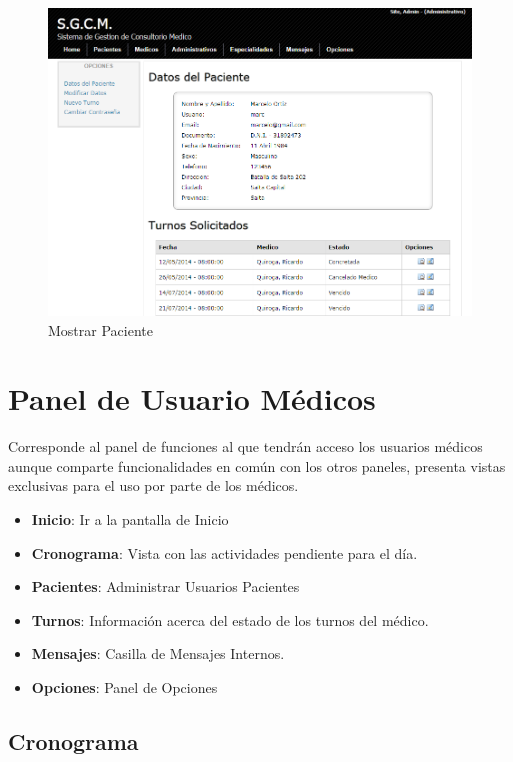 \begin{figure}[H]
    \centering
    \includegraphics[scale=0.5]{resourse/datos-paciente-a.png}
    \caption{Mostrar Paciente}
    \label{fig:613}
\end{figure}



\section{Panel de Usuario Médicos}

Corresponde al panel de funciones al que tendrán acceso los usuarios médicos aunque comparte funcionalidades en común con los otros paneles, presenta vistas exclusivas para el uso por parte de los médicos.

\begin{itemize}
    \item \textbf{Inicio}: Ir a la pantalla de Inicio
    \item \textbf{Cronograma}: Vista con las actividades pendiente para el día.
    \item \textbf{Pacientes}: Administrar Usuarios Pacientes
    \item \textbf{Turnos}: Información acerca del estado de los turnos del médico.
    \item \textbf{Mensajes}: Casilla de Mensajes Internos.
    \item \textbf{Opciones}: Panel de Opciones
\end{itemize}

\subsection{Cronograma}

